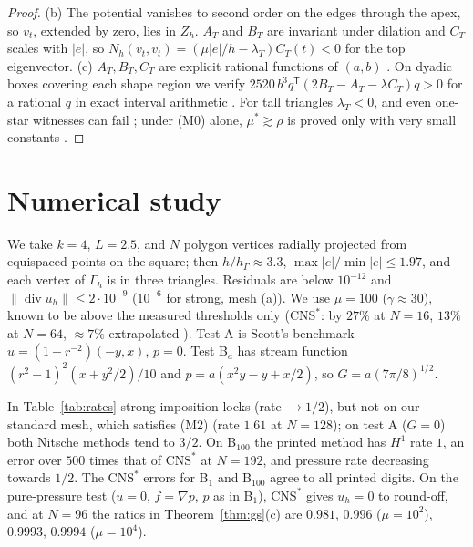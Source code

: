 \documentclass[5p,times]{elsarticle}
\theoremstyle{definition}
\newcommand{\hG}{h_\Gamma}
\newcommand{\Gh}{\Gamma_h}
\newcommand{\Zh}{Z_h}
\newcommand{\norm}[1]{\lVert #1\rVert}
\newcommand{\CNS}{\mathrm{CNS}^\ast}
\renewcommand{\div}{\operatorname{div}}
\newcommand{\ext}[1]{\cite[#1]{PadhiExt}}
\begin{document}
\begin{proof}
(b) The potential vanishes to second order on the edges through the apex, so $v_t$, extended by zero, lies in $\Zh$. $A_T$ and $B_T$ are invariant under dilation and $C_T$ scales with $|e|$, so $N_h(v_t,v_t)=(\mu|e|/h-\lambda_T)C_T(t)<0$ for the top eigenvector. (c) $A_T,B_T,C_T$ are explicit rational functions of $(a,b)$ \ext{\S10.1}. On dyadic boxes covering each shape region we verify $2520\,b^3q^{\mathsf T}(2B_T-A_T-\lambda C_T)q>0$ for a rational $q$ in exact interval arithmetic \ext{Prop.~10.3}. For tall triangles $\lambda_T<0$, and even one-star witnesses can fail \ext{Prop.~10.6}; under (M0) alone, $\mu^\ast\gtrsim\rho$ is proved only with very small constants \ext{Thm.~10.13}.
\end{proof}

\section{Numerical study}\label{sec:num}

We take $k=4$, $L=2.5$, and $N$ polygon vertices radially projected from equispaced points on the square; then $h/\hG\approx3.3$, $\max|e|/\min|e|\le1.97$, and each vertex of $\Gh$ is in three triangles. Residuals are below $10^{-12}$ and $\norm{\div u_h}\le2\cdot10^{-9}$ ($10^{-6}$ for strong, mesh (a)). We use $\mu=100$ ($\gamma\approx30$), known to be above the measured thresholds only ($\CNS$: by $27\%$ at $N=16$, $13\%$ at $N=64$, ${\approx}7\%$ extrapolated \ext{Rem.~15.18}). Test A is Scott's benchmark $u=(1-r^{-2})(-y,x)$, $p=0$. Test B$_a$ has stream function $(r^2-1)^2(x+y^2/2)/10$ and $p=a(x^2y-y+x/2)$, so $G=a(7\pi/8)^{1/2}$.


In Table~\ref{tab:rates} strong imposition locks (rate $\to1/2$), but not on our standard mesh, which satisfies (M2) (rate $1.61$ at $N=128$); on test A ($G=0$) both Nitsche methods tend to $3/2$. On B$_{100}$ the printed method has $H^1$ rate $1$, an error over $500$ times that of $\CNS$ at $N=192$, and pressure rate decreasing towards $1/2$. The $\CNS$ errors for B$_1$ and B$_{100}$ agree to all printed digits. On the pure-pressure test ($u=0$, $f=\nabla p$, $p$ as in B$_1$), $\CNS$ gives $u_h=0$ to round-off, and at $N=96$ the ratios in Theorem~\ref{thm:gs}(c) are $0.981$, $0.996$ ($\mu=10^2$), $0.9993$, $0.9994$ ($\mu=10^4$).
\end{document}
